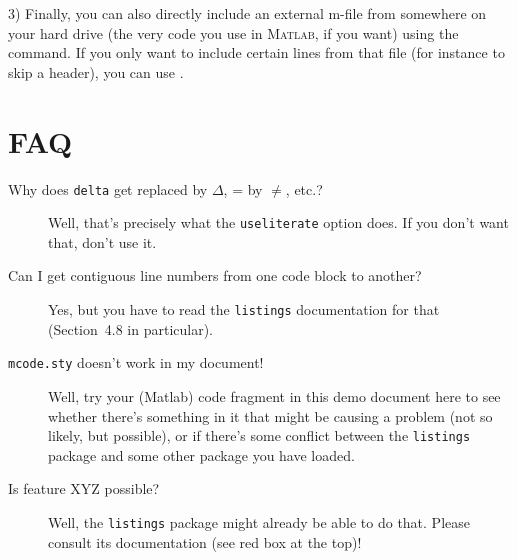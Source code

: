 \documentclass{article}
\begin{document}
3) Finally, you can also directly include an external m-file from somewhere on your hard drive (the very code you use in \textsc{Matlab}, if you want) using the \verb|| command.  If you only want to include certain lines from that file (for instance to skip a header), you can use \verb||.

\section*{FAQ}

\begin{description}
	\item[Why does {\tt delta} get replaced by $\Delta$, {\selectfont\texttildelow=} by $\neq$, etc.?]
		Well, that's precisely what the \verb|useliterate| option does. If you don't want that, don't use it.
	\item[Can I get contiguous line numbers from one code block to another?]
		Yes, but you have to read the \verb|listings| documentation for that (Section~4.8 in particular).
	\item[{\tt mcode.sty} doesn't work in my document!] Well, try your (Matlab) code fragment in this demo document here to see whether there's something in it that might be causing a problem (not so likely, but possible), or if there's some conflict between the \verb|listings| package and some other package you have loaded.
	\item[Is feature XYZ possible?] Well, the \verb|listings| package might already be able to do that. Please consult its documentation (see red box at the top)!
\end{description}
\end{document}

